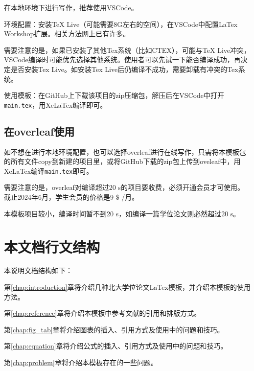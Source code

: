 在本地环境下进行写作，推荐使用VSCode。

环境配置：安装TeX Live（可能需要8G左右的空间），在VSCode中配置LaTex Workshop扩展。相关方法网上已有许多。

需要注意的是，如果已安装了其他Tex系统（比如CTEX），可能与TeX Live冲突，VSCode编译时可能优先选择其他系统。使用者可以先试一下能否编译成功，再决定是否安装Tex Live。如安装Tex Live后仍编译不成功，需要卸载有冲突的Tex系统。

使用模板：在GitHub上下载该项目的zip压缩包，解压后在VSCode中打开\texttt{main.tex}，用XeLaTex编译即可。

\subsection{在overleaf使用}

如不想在进行本地环境配置，也可以选择overleaf进行在线写作，只需将本模板包的所有文件copy到新建的项目里，或将GitHub下载的zip包上传到oveleaf中，用XeLaTex编译\texttt{main.tex}即可。

需要注意的是，overleaf对编译超过20 s的项目要收费，必须开通会员才可使用。截止2024年6月，学生会员的价格是9 $\$$ /月。

本模板项目较小，编译时间暂不到20 s，如编译一篇学位论文则必然超过20 s。

\section{本文档行文结构}

本说明文档结构如下：

第\ref{chap:introduction}章将介绍几种北大学位论文LaTex模板，并介绍本模板的使用方法。

第\ref{chap:reference}章将介绍本模板中参考文献的引用和排版方式。

第\ref{chap:fig_tab}章将介绍图表的插入、引用方式及使用中的问题和技巧。

第\ref{chap:equation}章将介绍公式的插入、引用方式及使用中的问题和技巧。

第\ref{chap:problem}章将介绍本模板存在的一些问题。
